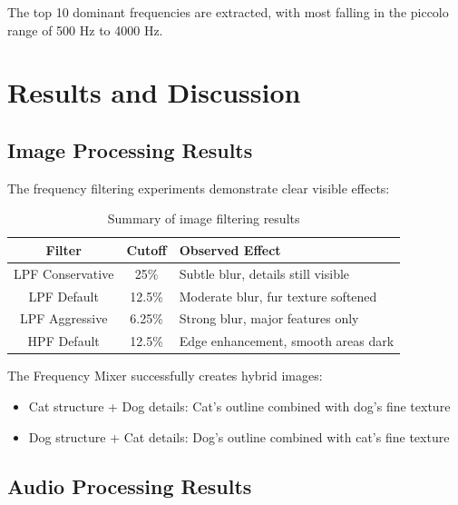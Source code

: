 \documentclass[12pt,a4paper]{article}
\begin{document}
\bigskip
The top 10 dominant frequencies are extracted, with most falling in the piccolo range of 500 Hz to 4000 Hz.

\bigskip
\section{Results and Discussion}

\subsection{Image Processing Results}
The frequency filtering experiments demonstrate clear visible effects:

\bigskip
\begin{table}[H]
    \centering
    \begin{tabular}{|c|c|p{5cm}|}
        \hline
        \textbf{Filter} & \textbf{Cutoff} & \textbf{Observed Effect} \\
        \hline
        LPF Conservative & 25\% & Subtle blur, details still visible \\
        \hline
        LPF Default & 12.5\% & Moderate blur, fur texture softened \\
        \hline
        LPF Aggressive & 6.25\% & Strong blur, major features only \\
        \hline
        HPF Default & 12.5\% & Edge enhancement, smooth areas dark \\
        \hline
    \end{tabular}
    \caption{Summary of image filtering results}
    \label{tab:image_results}
\end{table}

\bigskip
The Frequency Mixer successfully creates hybrid images:
\begin{itemize}
    \item Cat structure + Dog details: Cat's outline combined with dog's fine texture
    \item Dog structure + Cat details: Dog's outline combined with cat's fine texture
\end{itemize}

\bigskip
\subsection{Audio Processing Results}
\end{document}
